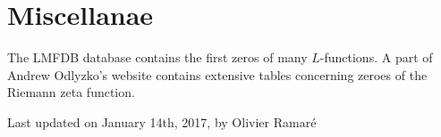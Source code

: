 \section{Miscellanae
}



The LMFDB database contains the first zeros
of many $L$-functions. A part of Andrew Odlyzko's 
website
contains extensive tables concerning zeroes of the Riemann zeta function.




 
 







  
  Last updated on January 14th, 2017, by Olivier Ramar\'e















